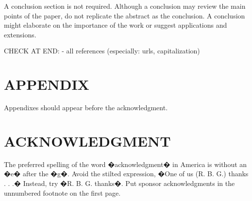 \documentclass[letterpaper, 10 pt, conference]{ieeeconf}  %
\begin{document}
A conclusion section is not required. Although a conclusion may review the main points of the paper, do not replicate the abstract as the conclusion. A conclusion might elaborate on the importance of the work or suggest applications and extensions. 

CHECK AT END:
 - all references (especially: urls, capitalization)

\addtolength{\textheight}{-12cm}   %







\section*{APPENDIX}

Appendixes should appear before the acknowledgment.

\section*{ACKNOWLEDGMENT}

The preferred spelling of the word �acknowledgment� in America is without an �e� after the �g�. Avoid the stilted expression, �One of us (R. B. G.) thanks . . .�  Instead, try �R. B. G. thanks�. Put sponsor acknowledgments in the unnumbered footnote on the first page.




\end{document}
